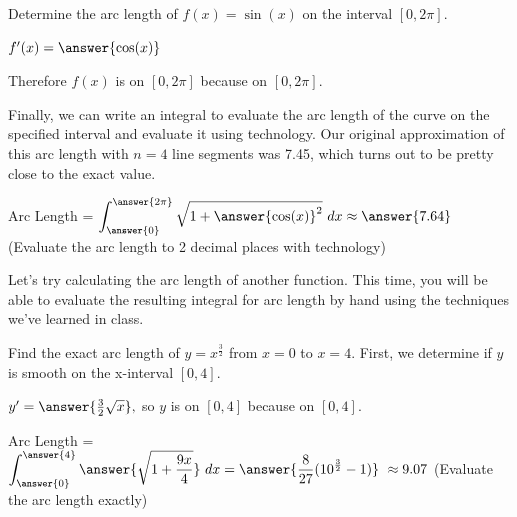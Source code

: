 \documentclass[handout,nooutcomes]{ximera}
\begin{document}
\begin{problem}

Determine the arc length of $f(x) = \sin(x)$ on the interval $[0, 2\pi].$

$f'(x) = \answer{\cos(x)}$

\begin{problem}

Therefore $f(x)$ is  on $[0,2\pi]$ because  on $[0,2\pi]$.  

\begin{problem}

Finally, we can write an integral to evaluate the arc length of the curve on the specified interval and evaluate it using technology.  Our original approximation of this arc length with $n=4$ line segments was 7.45, which turns out to be pretty close to the exact value.  

Arc Length = $\displaystyle\int_{\answer{0}}^{\answer{2\pi}} \sqrt{1+{\answer{\cos(x)}^2}} \ dx \approx \answer{7.64}$ (Evaluate the arc length to 2 decimal places with technology)


\end{problem}
\end{problem}
\end{problem}

Let's try calculating the arc length of another function.  This time, you will be able to evaluate the resulting integral for arc length by hand using the techniques we've learned in class.


\begin{problem}

Find the exact arc length of $y = x^{\frac{3}{2}}$ from $x=0$ to $x=4$.  First, we determine if $y$ is smooth on the x-interval $[0,4]$.  

$y' = \answer{\frac{3}{2}\sqrt{x}},$ so $y$ is  on $[0,4]$ because  on $[0,4]$.  

\begin{problem}

Arc Length = $\displaystyle\int_{\answer{0}}^{\answer{4}} \answer{\sqrt{1+\frac{9x}{4}}} \ dx = \answer{\frac{8}{27}(10^{\frac{3}{2}}-1)} \ \approx 9.07$ (Evaluate the arc length exactly)

\end{problem}
\end{problem}
\end{document}

